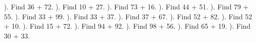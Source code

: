 \documentclass{article}%
\begin{document}
\newline%
\newline%
). Find 36 + 72.%
\newline%
\newline%
). Find 10 + 27.%
\newline%
\newline%
). Find 73 + 16.%
\newline%
\newline%
). Find 44 + 51.%
\newline%
\newline%
). Find 79 + 55.%
\newline%
\newline%
). Find 33 + 99.%
\newline%
\newline%
). Find 33 + 37.%
\newline%
\newline%
). Find 37 + 67.%
\newline%
\newline%
). Find 52 + 82.%
\newline%
\newline%
). Find 52 + 10.%
\newline%
\newline%
). Find 15 + 72.%
\newline%
\newline%
). Find 94 + 92.%
\newline%
\newline%
). Find 98 + 56.%
\newline%
\newline%
). Find 65 + 19.%
\newline%
\newline%
). Find 30 + 33.%
\newline%
\newline%
\end{document}
